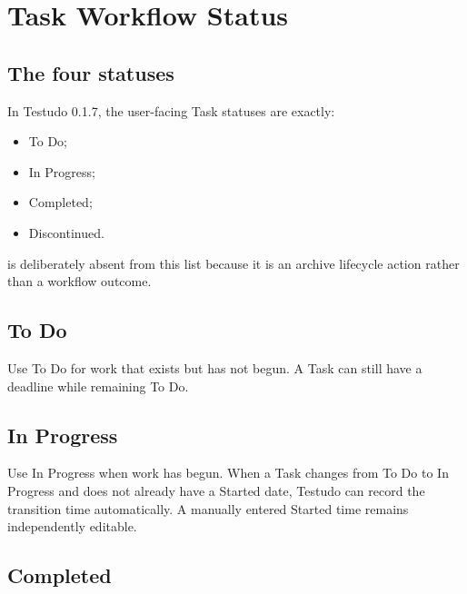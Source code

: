 \documentclass{testudomanual}
\begin{document}

\chapter{Task Workflow Status}

\section{The four statuses}

In Testudo 0.1.7, the user-facing Task statuses are exactly:
\begin{itemize}
    \item To Do;
    \item In Progress;
    \item Completed;
    \item Discontinued.
\end{itemize}

 is deliberately absent from this list because it is an archive lifecycle action rather than a workflow outcome.

\section{To Do}

Use To Do for work that exists but has not begun. A Task can still have a deadline while remaining To Do.

\section{In Progress}

Use In Progress when work has begun. When a Task changes from To Do to In Progress and does not already have a Started date, Testudo can record the transition time automatically. A manually entered Started time remains independently editable.

\section{Completed}
\end{document}
